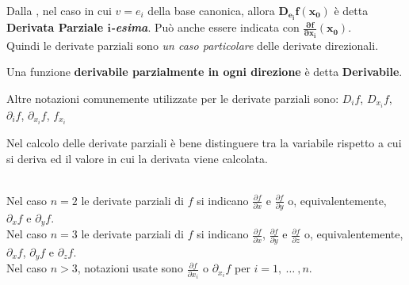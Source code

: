 \begin{definition}
	\label{def:deriv_parz}
	Dalla , nel caso in cui $v = e_i$ della base canonica, allora $\boldsymbol{D_{e_i} f(x_0)}$ è detta \textbf{Derivata Parziale $\boldsymbol{i}$\textit{-esima}}. Può anche essere indicata con $\boldsymbol{\frac{\partial f}{\partial x_i}(x_0)}$.\\
	Quindi le derivate parziali sono \textit{un caso particolare} delle derivate direzionali.

	\vspace*{\baselineskip}
	\noindent Una funzione \textbf{derivabile parzialmente in ogni direzione} è detta \textbf{Derivabile}.

	\begin{note}
		Altre notazioni comunemente utilizzate per le derivate parziali sono: $D_i f$, $D_{x_i} f$, $\partial_i f$, $\partial_{x_i} f$, $f_{x_i}$
	\end{note}
	\begin{note}
		Nel calcolo delle derivate parziali è bene distinguere tra la variabile rispetto a cui si deriva ed il valore in cui la derivata viene calcolata.
	\end{note}
	\begin{note}\hfill\\
		Nel caso $n = 2$ le derivate parziali di $f$ si indicano $\frac{\partial f}{\partial x}$ e $\frac{\partial f}{\partial y}$ o, equivalentemente, $\partial_x f$ e $\partial_y f$.\\
		Nel caso $n = 3$ le derivate parziali di $f$ si indicano $\frac{\partial f}{\partial x}$, $\frac{\partial f}{\partial y}$ e $\frac{\partial f}{\partial z}$ o, equivalentemente, $\partial_x f$, $\partial_y f$ e $\partial_z f$.\\
		Nel caso $n > 3$, notazioni usate sono $\frac{\partial f}{\partial x_i}$ o $\partial_{x_i} f$ per $i = 1,\:\dotsc\:,n$.
	\end{note}
\end{definition}
